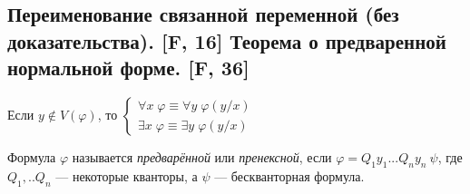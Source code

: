 \documentclass[a4paper, fleqn]{article}
\begin{document}
    \subsection{Переименование связанной переменной (без доказательства). [F, 16] Теорема о предваренной нормальной форме. [F, 36]}
    \begin{proposition}

        Если $y \notin V(\varphi)$, то $\begin{cases}
        \forall x \; \varphi \equiv \forall y \; \varphi(y/x) \\
        \exists x \; \varphi \equiv \exists y \; \varphi(y/x)
        \end{cases}$
    \end{proposition}

    \begin{definition}
        Формула $\varphi$ называется \textit{предварённой} или \textit{пренексной}, если $\varphi = Q_1y_1...Q_ny_n \: \psi$, где $Q_1,..Q_n$ --- некоторые кванторы, а $\psi$ --- бескванторная формула.
    \end{definition}
\end{document}
